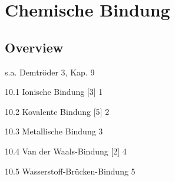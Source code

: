 \renewcommand{\lastmod}{10. September 2024}
\renewcommand{\chapterauthors}{Markus Lippitz}

\chapter{Chemische Bindung}






\section{Overview}

s.a. Demtröder 3, Kap. 9



10.1 Ionische Bindung [3] 1	

10.2 Kovalente Bindung [5] 2	

10.3 Metallische Bindung 3	

10.4 Van der Waals-Bindung [2] 4	

10.5 Wasserstoff-Brücken-Bindung 5	




\printbibliography[segment=\therefsegment,heading=subbibliography]
